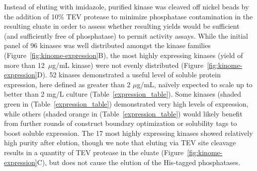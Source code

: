 \documentclass[9pt,lineno]{elife}
\begin{document}
Instead of eluting with imidazole, purified kinase was cleaved off nickel beads by the addition of 10\% TEV protease to minimize phosphatase contamination in the resulting eluate in order to assess whether resulting yields would be sufficient (and sufficiently free of phosphatase) to permit activity assays.
While the initial panel of 96 kinases was well distributed amongst the kinase families (Figure~\ref{fig:kinome-expression}B), the most highly expressing kinases (yield of more than 12~$\mu$g/mL kinase) were not evenly distributed (Figure~\ref{fig:kinome-expression}D). 
52 kinases demonstrated a useful level of soluble protein expression, here defined as greater than 2 $\mu$g/mL, na\"{i}vely expected to scale up to better than 2 mg/L culture (Table~\ref{expression_table}). 
Some kinases (shaded green in (Table~\ref{expression_table}) demonstrated very high levels of expression, while others (shaded orange in (Table~\ref{expression_table}) would likely benefit from further rounds of construct boundary optimization or solubility tags to boost soluble expression. 
The 17 most highly expressing kinases showed relatively high purity after elution, though we note that eluting via TEV site cleavage results in a quantity of TEV protease in the eluate (Figure~\ref{fig:kinome-expression}C), but does not cause the elution of the His-tagged phosphatases. 
\end{document}
